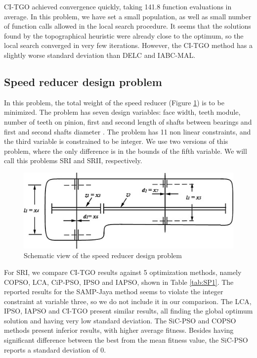 CI-TGO achieved convergence quickly, taking 141.8 function evaluations in average. In this problem, we have set a small population, as well as small number of function calls allowed in the local search procedure. It seems that the solutions found by the topographical heuristic were already close to the optimum, so the local search converged in very few iterations. However, the CI-TGO method has a slightly worse standard deviation than DELC and IABC-MAL.





\subsection{Speed reducer design problem}

In this problem, the total weight of the speed reducer (Figure \ref{fig:SR}) is to be minimized. The problem has seven design variables: face width, teeth module, number of teeth on pinion, first and second length of shafts between bearings and first and second shafts diameter \citep{SR}. The problem has 11 non linear constraints, and the third variable is constrained to be integer. We use two versions of this problem, where the only difference is in the bounds of the fifth variable. We will call this problems SRI and SRII, respectively.


\begin{figure}[h]
\begin{center}
\includegraphics[scale=0.6]{Imgs/SR.jpg}
\end{center}
\captionsetup{justification=centering}
\caption{Schematic view of the speed reducer design problem}\label{fig:SR}
\end{figure}

For SRI, we compare CI-TGO results against 5 optimization methods, namely COPSO, LCA, CiP-PSO, IPSO and IAPSO, shown in Table \ref{tab:SP1}. The reported results for the SAMP-Jaya method seems to violate the integer constraint at variable three, so we do not include it in our comparison. The LCA, IPSO, IAPSO and CI-TGO present similar results, all finding the global optimum solution and having very low standard deviation. The SiC-PSO and COPSO methods present inferior results, with higher average fitness. Besides having significant difference between the best from the mean fitness value, the SiC-PSO reports a standard deviation of 0.

